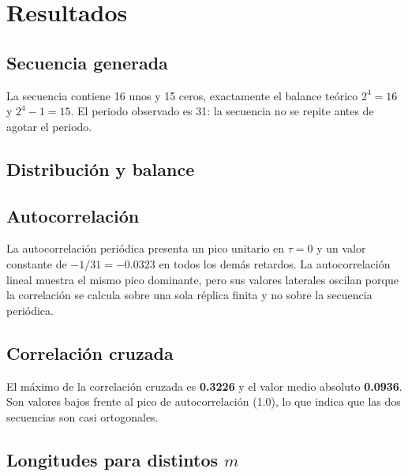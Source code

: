 \documentclass[11pt,a4paper]{article}
\begin{document}
\section{Resultados}

\subsection{Secuencia generada}


La secuencia contiene 16 unos y 15 ceros, exactamente el balance teórico
$2^{4}=16$ y $2^{4}-1=15$. El periodo observado es 31: la secuencia no se repite antes
de agotar el periodo.

\subsection{Distribución y balance}


\subsection{Autocorrelación}


La autocorrelación periódica presenta un pico unitario en $\tau=0$ y un valor constante
de $-1/31=-0.0323$ en todos los demás retardos. La autocorrelación lineal muestra el mismo
pico dominante, pero sus valores laterales oscilan porque la correlación se calcula sobre
una sola réplica finita y no sobre la secuencia periódica.

\subsection{Correlación cruzada}


El máximo de la correlación cruzada es \textbf{0.3226} y el valor medio absoluto
\textbf{0.0936}. Son valores bajos frente al pico de autocorrelación (1.0), lo que indica
que las dos secuencias son casi ortogonales.

\subsection{Longitudes para distintos $m$}
\end{document}
